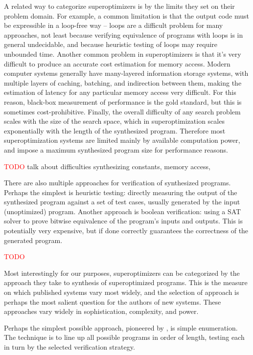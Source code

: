 \documentclass[12pt,twoside]{reedthesis}
\newcommand{\red}[1]{\textcolor{red}{#1}}
\begin{document}
A related way to categorize superoptimizers is by the limits they set on their problem domain.
For example, a common limitation is that the output code must be expressible in a loop-free way
    -- loops are a difficult problem for many approaches,
        not least because verifying equivalence of programs with loops is in general undecidable,
        and because heuristic testing of loops may require unbounded time.
Another common problem in superoptimizers is that it's very difficult to produce an accurate cost estimation for memory access.
    Modern computer systems generally have many-layered information storage systems, with multiple layers of caching, batching, and indirection between them, making the estimation of latency for any particular memory access very difficult.
    For this reason, black-box measurement of performance is the gold standard, but this is sometimes cost-prohibitive.
Finally, the overall difficulty of any search problem scales with the size of the search space, which in superoptimization scales exponentially with the length of the synthesized program.
    Therefore most superoptimization systems are limited mainly by available computation power, and impose a maximum synthesized program size for performance reasons.

\red{TODO} talk about difficulties synthesizing constants, memory access, %

There are also multiple approaches for verification of synthesized programs.
Perhaps the simplest is heuristic testing: 
    directly measuring the output of the synthesized program against a set of test cases, usually generated by the input (unoptimized) program.
Another approach is boolean verification: using a SAT solver to prove bitwise equivalence of the program's inputs and outputs.
This is potentially very expensive, but if done correctly guarantees the correctness of the generated program. 

\red{TODO}

Most interestingly for our purposes, superoptimizers can be categorized by the approach they take to synthesis of superoptimized programs.
This is the measure on which published systems vary most widely, and the selection of approach is perhaps the most salient question for the authors of new systems.
These approaches vary widely in sophistication, complexity, and power.

Perhaps the simplest possible approach, pioneered by \cite{massalin1987superoptimizer}, is simple enumeration. 
The technique is to line up all possible programs in order of length, testing each in turn by the selected verification strategy. 
\end{document}
